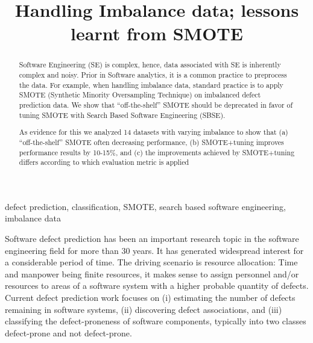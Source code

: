 \documentclass[conference]{IEEEtran}
\begin{document}
%
\title{Handling Imbalance data; lessons learnt from SMOTE}


\author{
\and
{}
}
\maketitle

\maketitle


\begin{abstract}
Software Engineering (SE) is complex, hence, data associated with SE is inherently complex and noisy. Prior in Software analytics, it is a common practice to preprocess the data. For example, when handling imbalance data, standard practice is to apply SMOTE (Synthetic Minority Oversampling Technique) on imbalanced defect prediction data. We show that ``off-the-shelf'' SMOTE should be deprecated in favor of tuning SMOTE with Search Based Software Engineering (SBSE). 

As evidence for this we analyzed 14 datasets with varying imbalance to show that (a) ``off-the-shelf'' SMOTE often decreasing performance, (b) SMOTE+tuning improves performance results by 10-15\%, and (c) the improvements achieved by SMOTE$+$tuning differs according to which evaluation metric is applied
\end{abstract}

\begin{IEEEkeywords}
defect prediction, classification, SMOTE, search based software engineering, imbalance data
\end{IEEEkeywords}


\IEEEpeerreviewmaketitle


Software defect prediction has been an important research topic in the software engineering field for more than 30 years. It has generated widespread interest for a
considerable period of time. The driving scenario is resource
allocation: Time and manpower being finite resources, it
makes sense to assign personnel and/or resources to areas of
a software system with a higher probable quantity of defects. Current defect prediction work focuses on (i) estimating the number of defects remaining in software systems, (ii) discovering defect associations, and (iii) classifying the defect-proneness of software components, typically into two classes defect-prone and not defect-prone. 
\end{document}
